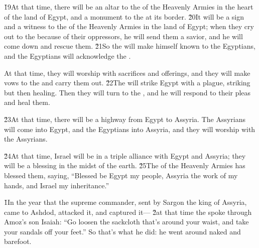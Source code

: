 \v{19}At that time, there will be an altar to the  of the Heavenly Armies in the heart of the land of Egypt, and a monument to the  at its border. \v{20}It will be a sign and a witness to the  of the Heavenly Armies in the land of Egypt; when they cry out to the  because of their oppressors, he will send them a savior, and he will come down and rescue them. \v{21}So the  will make himself known to the Egyptians, and the Egyptians will acknowledge the .

At that time, they will worship with sacrifices and offerings, and they will make vows to the  and carry them out. \v{22}The  will strike Egypt with a plague, striking but then healing. Then they will turn to the , and he will respond to their pleas and heal them.

\v{23}At that time, there will be a highway from Egypt to Assyria. The Assyrians will come into Egypt, and the Egyptians into Assyria, and they will worship with the Assyrians.

\v{24}At that time, Israel will be in a triple alliance with Egypt and Assyria; they will be a blessing in the midst of the earth. \v{25}The  of the Heavenly Armies has blessed them, saying, ``Blessed be Egypt my people, Assyria the work of my hands, and Israel my inheritance.''

\v{1}In the year that the supreme commander, sent by Sargon the king of Assyria, came to Ashdod, attacked it, and captured it--- \v{2}at that time the  spoke through Amoz's son Isaiah: ``Go loosen the sackcloth that's around your waist, and take your sandals off your feet.'' So that's what he did: he went around naked and barefoot.


